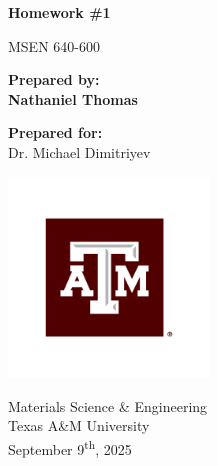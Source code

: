 \thispagestyle{empty}

\begin{titlepage}
  \begin{center}
    \vspace*{2cm}

    \Huge
    \textbf{Homework \#1}

    \vspace{0.8cm}

    \LARGE
    MSEN 640-600

    \vspace{2cm}

    \Large
    \textbf{Prepared by:}\\[0.5cm]
    \huge
    \textbf{Nathaniel Thomas}

    \vspace{1cm}

    \Large
    \textbf{Prepared for:}\\[0.5cm]
    \large
    Dr. Michael Dimitriyev

    \vfill

    \includegraphics[width=0.4\textwidth]{"./assets/a&m_logo.pdf"}

    \vspace{1cm}

    \Large
    Materials Science \& Engineering\\
    Texas A\&M University\\
    \vspace{0.5cm}
    \large
    September 9\textsuperscript{th}, 2025

  \end{center}
\end{titlepage}
